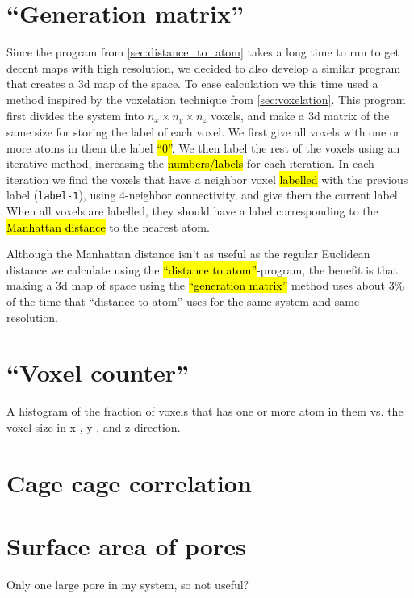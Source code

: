 \section{``Generation matrix''}
Since the program from \cref{sec:distance_to_atom} takes a long time to run to get decent maps with high resolution, we decided to also develop a similar program that creates a 3d map of the space. To ease calculation we this time used a method inspired by the voxelation technique from \cref{sec:voxelation}. This program first divides the system into $n_x\times n_y\times n_z$ voxels, and make a 3d matrix of the same size for storing the label of each voxel. We first give all voxels with one or more atoms in them the label \hl{``0''}. We then label the rest of the voxels using an iterative method, increasing the \hl{numbers/labels} for each iteration. In each iteration we find the voxels that have a neighbor voxel \hl{labelled} with the previous label (\texttt{label-1}), using 4-neighbor connectivity, and give them the current label. When all voxels are labelled, they should have a label corresponding to the \hl{Manhattan distance} to the nearest atom.

Although the Manhattan distance isn't as useful as the regular Euclidean distance we calculate using the \hl{``distance to atom''}-program, the benefit is that making a 3d map of space using the \hl{``generation matrix''} method uses about 3\% of the time that ``distance to atom'' uses for the same system and same resolution. 



\section{``Voxel counter''}
    A histogram of the fraction of voxels that has one or more atom in them vs. the voxel size in x-, y-, and z-direction.
    
\section{Cage cage correlation}

\section{Surface area of pores}
    Only one large pore in my system, so not useful?
